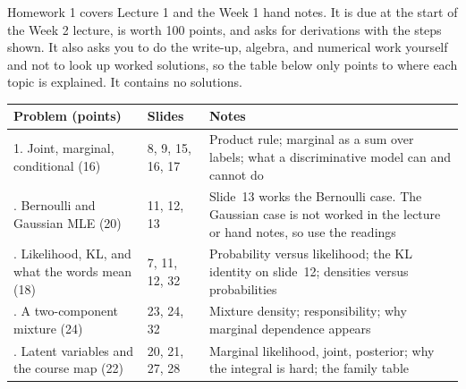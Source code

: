 Homework 1 covers Lecture 1 and the Week 1 hand notes. It is due at the start of the Week 2 lecture, is worth 100 points, and asks for derivations with the steps shown. It also asks you to do the write-up, algebra, and numerical work yourself and not to look up worked solutions, so the table below only points to where each topic is explained. It contains no solutions.

\begin{center}
\begin{tabular}{p{}p{}p{}}
\toprule
Problem (points) & Slides & Notes \\
\midrule
1. Joint, marginal, conditional (16) & 8, 9, 15, 16, 17 & Product rule; marginal as a sum over labels; what a discriminative model can and cannot do \\ \addlinespace
2. Bernoulli and Gaussian MLE (20) & 11, 12, 13 & Slide~13 works the Bernoulli case. The Gaussian case is not worked in the lecture or hand notes, so use the readings \\ \addlinespace
3. Likelihood, KL, and what the words mean (18) & 7, 11, 12, 32 & Probability versus likelihood; the KL identity on slide~12; densities versus probabilities \\ \addlinespace
4. A two-component mixture (24) & 23, 24, 32 & Mixture density; responsibility; why marginal dependence appears \\ \addlinespace
5. Latent variables and the course map (22) & 20, 21, 27, 28 & Marginal likelihood, joint, posterior; why the integral is hard; the family table \\
\bottomrule
\end{tabular}
\end{center}

